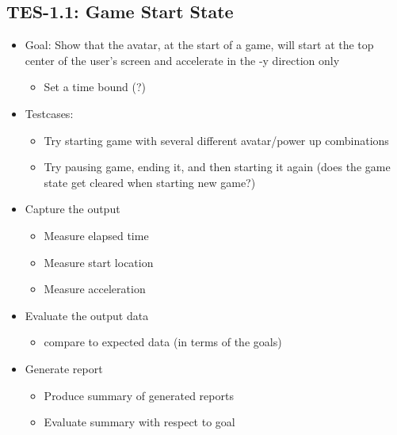 \subsection{TES-1.1: Game Start State }
\begin{itemize}
\item Goal: Show that the avatar, at the start of a game, will start at
the top center of the user\textquoteright{}s screen and accelerate
in the -y direction only 

\begin{itemize}
\item Set a time bound (?) 
\end{itemize}
\item Testcases: 

\begin{itemize}
\item Try starting game with several different avatar/power up combinations 
\item Try pausing game, ending it, and then starting it again (does the
game state get cleared when starting new game?) 
\end{itemize}
\item Capture the output 

\begin{itemize}
\item Measure elapsed time 
\item Measure start location 
\item Measure acceleration 
\end{itemize}
\item Evaluate the output data 

\begin{itemize}
\item compare to expected data (in terms of the goals) 
\end{itemize}
\item Generate report 

\begin{itemize}
\item Produce summary of generated reports 
\item Evaluate summary with respect to goal
\end{itemize}
\end{itemize}

